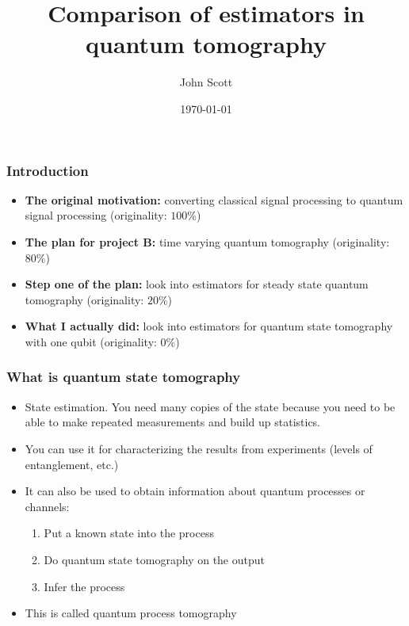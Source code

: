 \documentclass{beamer}
\title{Comparison of estimators in quantum tomography}
\author{John Scott}
\date{\today}
\begin{document}
\begin{frame}
  \titlepage
\end{frame}


\begin{frame}
  \frametitle{Introduction}
  \begin{itemize}
  \item \textbf{The original motivation:} converting classical signal processing to quantum signal processing (originality: $100\%$)
  \item \textbf{The plan for project B:} time varying quantum tomography (originality: $80\%$)
  \item \textbf{Step one of the plan:} look into estimators for steady state quantum tomography (originality: $20\%$)
  \item \textbf{What I actually did:} look into estimators for quantum state tomography with one qubit (originality: $0\%$)
  \end{itemize}
\end{frame}

\begin{frame}
  \frametitle{What is quantum state tomography}
  \begin{itemize}
  \item State estimation. You need many copies of the state because you need to be able to make repeated measurements and build up statistics.
  \item You can use it for characterizing the results from experiments (levels of entanglement, etc.)
  \item It can also be used to obtain information about quantum processes or channels:
    \begin{enumerate}
    \item Put a known state into the process
    \item Do quantum state tomography on the output
    \item Infer the process
    \end{enumerate}
    \item This is called quantum process tomography
  \end{itemize}
\end{frame}
\end{document}
